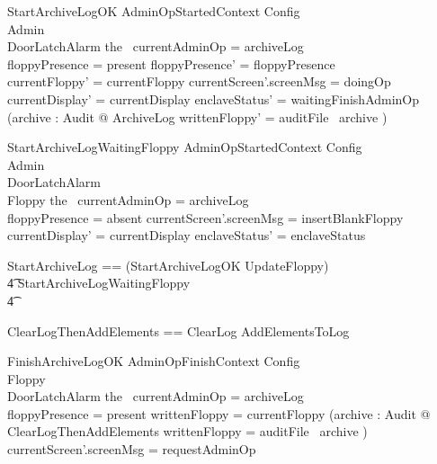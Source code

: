 \begin{schema}{StartArchiveLogOK}
        AdminOpStartedContext
\also   
        \Xi Config
\\      \Xi Admin 
\\      \Xi DoorLatchAlarm    
\where
        the~ currentAdminOp = archiveLog
\\      floppyPresence = present
\also
        floppyPresence' = floppyPresence
\\      currentFloppy' = currentFloppy
\also
        currentScreen'.screenMsg = doingOp
\\      currentDisplay' = currentDisplay
\also
        enclaveStatus' = waitingFinishAdminOp
\\      (\exists archive : \finset Audit @ ArchiveLog \land
writtenFloppy' = auditFile~ archive )
\end{schema}

\begin{schema}{StartArchiveLogWaitingFloppy}
        AdminOpStartedContext
\also   
        \Xi Config
\\      \Xi Admin 
\\      \Xi DoorLatchAlarm    
\\      \Xi Floppy
\where
        the~ currentAdminOp = archiveLog
\\      floppyPresence = absent
\also
        currentScreen'.screenMsg = insertBlankFloppy
\\      currentDisplay' = currentDisplay
\also
        enclaveStatus' = enclaveStatus
\end{schema}

\begin{zed}
        StartArchiveLog == (StartArchiveLogOK \semi UpdateFloppy) 
\\ \t4                  \lor StartArchiveLogWaitingFloppy
\\ \t4  \lor
        [~ BadAdminLogout | enclaveStatus = waitingStartAdminOp 
\\ \t6                          \land the~ currentAdminOp = archiveLog 
                                ~]
\end{zed}

\begin{zed}
        ClearLogThenAddElements == ClearLog \semi AddElementsToLog
\end{zed}

\begin{schema}{FinishArchiveLogOK}
        AdminOpFinishContext
\also
        \Xi Config
\\      \Xi Floppy
\\      \Xi DoorLatchAlarm
\where
        the~ currentAdminOp = archiveLog
\\      floppyPresence = present
\also
        writtenFloppy = currentFloppy
\also
        (\exists archive : \finset Audit @ ClearLogThenAddElements
         \land
        writtenFloppy = auditFile~ archive )
\also
        currentScreen'.screenMsg = requestAdminOp
\end{schema}

